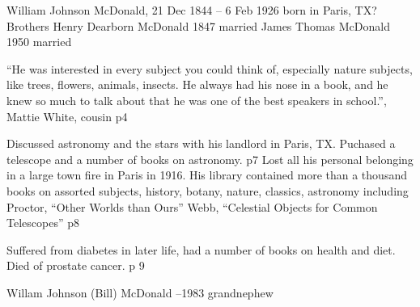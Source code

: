 
William Johnson McDonald, 21 Dec 1844 -- 6 Feb 1926
born in Paris, TX?
Brothers
Henry Dearborn McDonald 1847  married
James Thomas McDonald 1950  married

``He was interested in every subject you could think of, especially
nature subjects, like trees, flowers, animals, insects.  He always had
his nose in a book, and he knew so much to talk about that he was one
of the best speakers in school.'', Mattie White, cousin
\cite{maybatch1939} p4

Discussed astronomy and the stars with his landlord in Paris, TX.
Puchased a telescope and a number of books on astronomy.
\cite{maybatch1939} p7
Lost all his personal belonging in a large town fire in Paris
in 1916.
His library contained more than a thousand books on assorted
subjects, history, botany, nature, classics, astronomy including
Proctor, ``Other Worlds than Ours''
Webb, ``Celestial Objects for Common Telescopes''
p8

Suffered from diabetes in later life, had a number of books
on health and diet.
Died of prostate cancer.
p 9

Willam Johnson (Bill) McDonald --1983 grandnephew
